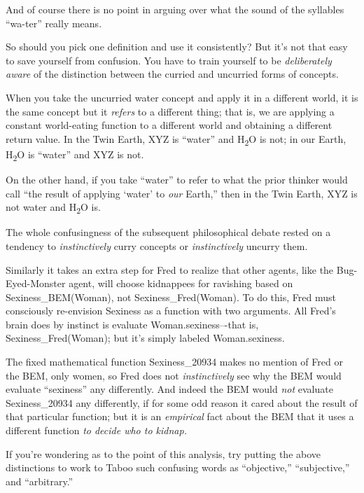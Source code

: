 {
 And of course there is no point in arguing over what the sound of
the syllables ``wa-ter'' really
means.}

{
 So should you pick one definition and use it consistently? But
it's not that easy to save yourself from confusion. You
have to train yourself to be \textit{deliberately aware} of the
distinction between the curried and uncurried forms of concepts.}

{
 When you take the uncurried water concept and apply it in a
different world, it is the same concept but it \textit{refers} to a
different thing; that is, we are applying a constant world-eating
function to a different world and obtaining a different return value.
In the Twin Earth, XYZ is ``water''
and H\textsubscript{2}O is not; in our Earth, H\textsubscript{2}O is
``water'' and XYZ is not.}

{
 On the other hand, if you take
``water'' to refer to what the prior
thinker would call ``the result of applying
`water' to \textit{our}
Earth,'' then in the Twin Earth, XYZ is not water and
H\textsubscript{2}O is.}

{
 The whole confusingness of the subsequent philosophical debate
rested on a tendency to \textit{instinctively} curry concepts or
\textit{instinctively} uncurry them.}

{
 Similarly it takes an extra step for Fred to realize that other
agents, like the Bug-Eyed-Monster agent, will choose kidnappees for
ravishing based on Sexiness\_BEM(Woman), not Sexiness\_Fred(Woman). To
do this, Fred must consciously re-envision Sexiness as a function with
two arguments. All Fred's brain does by instinct is
evaluate Woman.sexiness--{}-that is, Sexiness\_Fred(Woman); but
it's simply labeled Woman.sexiness.}

{
 The fixed mathematical function Sexiness\_20934 makes no mention
of Fred or the BEM, only women, so Fred does not \textit{instinctively}
see why the BEM would evaluate
``sexiness'' any differently. And
indeed the BEM would \textit{not} evaluate Sexiness\_20934 any
differently, if for some odd reason it cared about the result of that
particular function; but it is an \textit{empirical} fact about the BEM
that it uses a different function \textit{to decide who to kidnap.}}

{
 If you're wondering as to the point of this
analysis, try putting the above distinctions to work to Taboo such
confusing words as ``objective,''
``subjective,'' and
``arbitrary.''}

\myendsectiontext

